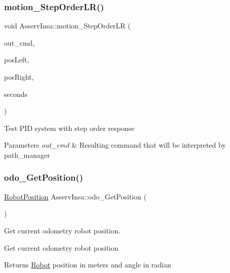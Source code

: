 \subsubsection{\texorpdfstring{motion\+\_\+\+Step\+Order\+L\+R()}{motion\_StepOrderLR()}}
{\footnotesize\ttfamily void Asserv\+Insa\+::motion\+\_\+\+Step\+Order\+LR (\begin{DoxyParamCaption}\item[{\hyperlink{structRobotCommand}{Robot\+Command} $\ast$}]{out\+\_\+cmd,  }\item[{int32}]{pos\+Left,  }\item[{int32}]{pos\+Right,  }\item[{int}]{seconds }\end{DoxyParamCaption})}

Test P\+ID system with step order response 
\begin{DoxyParams}{Parameters}
{\em out\+\_\+cmd} & Resulting command that will be interpreted by path\+\_\+manager \\
\hline
\end{DoxyParams}
\mbox{\label{classAsservInsa_ad3ba1c750cbefac429d6901b579a61a8}} 
\subsubsection{\texorpdfstring{odo\+\_\+\+Get\+Position()}{odo\_GetPosition()}}
{\footnotesize\ttfamily \hyperlink{structRobotPosition}{Robot\+Position} Asserv\+Insa\+::odo\+\_\+\+Get\+Position (\begin{DoxyParamCaption}\item[{void}]{ }\end{DoxyParamCaption})}



Get current odometry robot position. 

Get current odometry robot position

\begin{DoxyReturn}{Returns}
\hyperlink{classRobot}{Robot} position in meters and angle in radian 
\end{DoxyReturn}
\mbox{\label{classAsservInsa_a81c2ebb47e4d076df72b46dda9798828}} 
